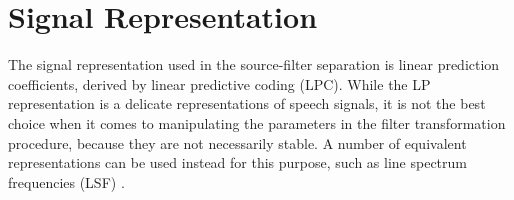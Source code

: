 % 
% 
% 
% 

\section{Signal Representation} %
\label{the:signal_representation}
The signal representation used in the source-filter separation is linear prediction coefficients, derived by linear predictive coding (LPC). While the LP representation is a delicate representations of speech signals, it is not the best choice when it comes to manipulating the parameters in the filter transformation procedure, because they are not necessarily stable. A number of equivalent representations can be used instead for this purpose, such as line spectrum frequencies (LSF) \cite{taletek}.

